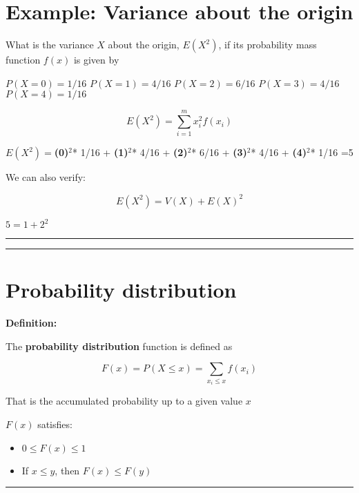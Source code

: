 \documentclass[
]{book}
\providecommand{\tightlist}{%
  \setlength{\itemsep}{0pt}\setlength{\parskip}{0pt}}
\begin{document}
\hypertarget{example-variance-about-the-origin}{%
\section{Example: Variance about the origin}\label{example-variance-about-the-origin}}

What is the variance \(X\) about the origin, \(E(X^2)\), if its probability mass function \(f(x)\) is given by

\(P(X=0)=1/16\)
\(P(X=1)=4/16\)
\(P(X=2)=6/16\)
\(P(X=3)=4/16\)
\(P(X=4)=1/16\)

\[E(X^2) =\sum_{i=1}^m x_i^2 f(x_i)\]

\(E(X^2)=\)\textbf{(0)}\(^2\)* 1/16 + \textbf{(1)}\(^2\)* 4/16 + \textbf{(2)}\(^2\)* 6/16 + \textbf{(3)}\(^2\)* 4/16 + \textbf{(4)}\(^2\)* 1/16 =5

We can also verify:

\[E(X^2)=V(X)+E(X)^2\]

\(5=1+2^2\)

\begin{center}\rule{0.5\linewidth}{0.5pt}\end{center}

\begin{center}\rule{0.5\linewidth}{0.5pt}\end{center}

\hypertarget{probability-distribution}{%
\section{Probability distribution}\label{probability-distribution}}

\textbf{Definition:}

The \textbf{probability distribution} function is defined as

\[F(x)=P(X\leq x)=\sum_{x_i\leq x} f(x_i) \]

That is the accumulated probability up to a given value \(x\)

\(F(x)\) satisfies:

\begin{itemize}
\tightlist
\item
  \(0\leq F(x) \leq 1\)
\item
  If \(x \leq y\), then \(F(x) \leq F(y)\)
\end{itemize}

\begin{center}\rule{0.5\linewidth}{0.5pt}\end{center}
\end{document}
